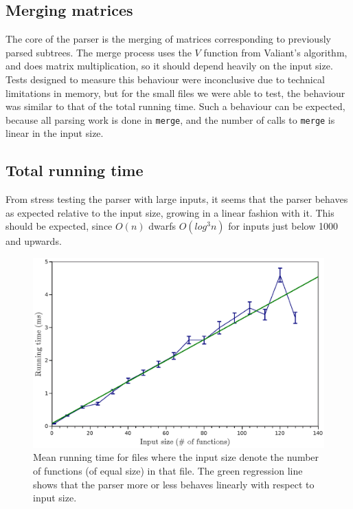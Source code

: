 \documentclass[a4paper,12pt,notitlepage]{report}
\begin{document}
\subsection{Merging matrices}
The core of the parser is the merging of matrices corresponding to previously
parsed subtrees. The merge process uses the $V$ function from Valiant's
algorithm, and does matrix multiplication, so it should depend heavily on the
input size. Tests designed to measure this behaviour were inconclusive due to
technical limitations in memory, but for the small files we were able to test,
the behaviour was similar to that of the total running time. Such a behaviour
can be expected, because all parsing work is done in \texttt{merge}, and the
number of calls to \texttt{merge} is linear in the input size. 

\subsection{Total running time}
From stress testing the parser with large inputs, it seems that the parser
behaves as expected relative to the input size, growing in a linear fashion with
it. This should be expected, since $O(n)$ dwarfs $O(log^3 n)$ for inputs just
below 1000 and upwards.

\begin{figure}[H]
\includegraphics[width=\textwidth]{criterion-1-128.eps}
\caption{\label{criterion} \small Mean running time for files where the input size denote the
number of functions (of equal size) in that file. The green regression line
shows that the parser more or less behaves linearly with respect to input size.}
\end{figure}
\end{document}

